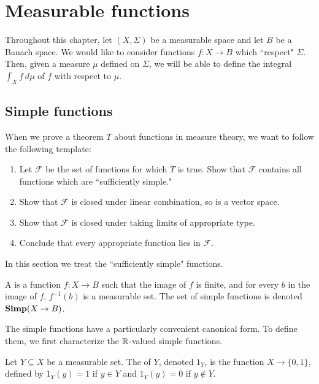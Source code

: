 \chapter{Measurable functions}
Throughout this chapter, let $(X, \Sigma)$ be a measurable space and let $B$ be a Banach space.
We would like to consider functions $f: X \to B$ which ``respect" $\Sigma$. Then, given a measure $\mu$ defined on $\Sigma$, we will be able to define the integral $\int_X f~d\mu$ of $f$ with respect to $\mu$.

\section{Simple functions}
When we prove a theorem $T$ about functions in measure theory, we want to follow the following template:
\begin{enumerate}
\item Let $\mathcal F$ be the set of functions for which $T$ is true. Show that $\mathcal F$ contains all functions which are ``sufficiently simple."
\item Show that $\mathcal F$ is closed under linear combination, so is a vector space.
\item Show that $\mathcal F$ is closed under taking limits of appropriate type.
\item Conclude that every appropriate function lies in $\mathcal F$.
\end{enumerate}
In this section we treat the ``sufficiently simple" functions.

\begin{definition}
A  is a function $f: X \to B$ such that the image of $f$ is finite, and for every $b$ in the image of $f$, $f^{-1}(b)$ is a measurable set.
The set of simple functions is denoted $\mathbf{Simp}(X \to B)$.
\end{definition}

\begin{subsec}
The simple functions have a particularly convenient canonical form.
To define them, we first characterize the $\mathbb{R}$-valued simple functions.
\end{subsec}

\begin{definition}
Let $Y \subseteq X$ be a measurable set. The  of $Y$, denoted $1_Y$, is the function $X \to \{0, 1\}$, defined by $1_Y(y) = 1$ if $y \in Y$ and $1_Y(y) = 0$ if $y \notin Y$.
\end{definition}

